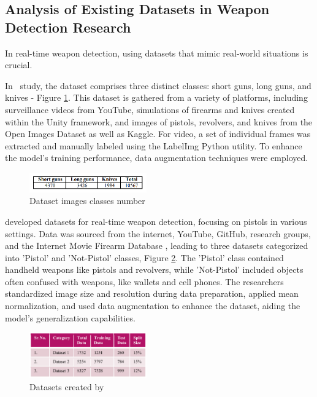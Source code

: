 \subsection{Analysis of Existing Datasets in Weapon Detection Research}
In real-time weapon detection, using datasets that mimic real-world situations is crucial.

In~\citet{rfc3} study, the dataset comprises three distinct classes: short guns, long guns, and knives - Figure \ref{fig:rehman-dataset}. This dataset is gathered from a variety of platforms, including surveillance videos from YouTube, simulations of firearms and knives created within the Unity framework, and images of pistols, revolvers, and knives from the Open Images Dataset as well as Kaggle. For video, a set of individual frames was extracted and manually labeled using the LabelImg Python utility. To enhance the model's training performance, data augmentation techniques were employed.

\begin{figure}[h]
    \centering 
    \includegraphics[width=0.45\textwidth]{figs/rheman-dataset.png} 
    \caption{Dataset images classes number~\cite{rfc3} }
    \label{fig:rehman-dataset}
\end{figure}

\citet{rfc4} developed datasets for real-time weapon detection, focusing on pistols in various settings. Data was sourced from the internet, YouTube, GitHub, research groups, and the Internet Movie Firearm Database \cite{rfc28}, leading to three datasets categorized into 'Pistol' and 'Not-Pistol' classes, Figure \ref{fig:bathi-dataset}. The 'Pistol' class contained handheld weapons like pistols and revolvers, while 'Not-Pistol' included objects often confused with weapons, like wallets and cell phones. The researchers standardized image size and resolution during data preparation, applied mean normalization, and used data augmentation to enhance the dataset, aiding the model's generalization capabilities.
\begin{figure}[h]
    \centering 
    \includegraphics[width=0.45\textwidth]{figs/bathi-dataset.png} 
    \caption{Datasets created by~\cite{rfc4}}
    \label{fig:bathi-dataset}
\end{figure}

